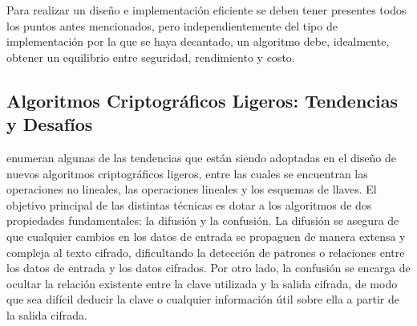 \documentclass[a4paper,10pt]{article}
\begin{document}
	Para realizar un diseño e implementación eficiente se deben tener presentes todos los puntos antes mencionados, pero independientemente del tipo de implementación por la que se haya decantado, un algoritmo debe, idealmente, obtener un equilibrio entre seguridad, rendimiento y costo.
	\subsection{Algoritmos Criptográficos Ligeros: Tendencias y Desafíos}
	\label{sec.2.1}
	\textcite{biryukov2017state} enumeran algunas de las tendencias que están siendo adoptadas en el diseño de nuevos algoritmos criptográficos ligeros, entre las cuales se encuentran las operaciones no lineales, las operaciones lineales y los esquemas de llaves. El objetivo principal de las distintas técnicas es dotar a los algoritmos de dos propiedades fundamentales: la difusión y la confusión. La difusión se asegura de que cualquier cambios en los datos de entrada se propaguen de manera extensa y compleja al texto cifrado, dificultando la detección de patrones o relaciones entre los datos de entrada y los datos cifrados. Por otro lado, la confusión se encarga de ocultar la relación existente entre la clave utilizada y la salida cifrada, de modo que sea difícil deducir la clave o cualquier información útil sobre ella a partir de la salida cifrada.
\end{document}
